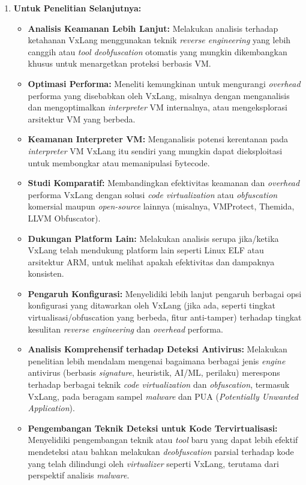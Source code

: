 \begin{enumerate}
    \item \textbf{Untuk Penelitian Selanjutnya:}
        \begin{itemize}
            \item \textbf{Analisis Keamanan Lebih Lanjut:} Melakukan analisis terhadap ketahanan VxLang menggunakan teknik \textit{reverse engineering} yang lebih canggih atau \textit{tool deobfuscation} otomatis yang mungkin dikembangkan khusus untuk menargetkan proteksi berbasis VM.
            \item \textbf{Optimasi Performa:} Meneliti kemungkinan untuk mengurangi \textit{overhead} performa yang disebabkan oleh VxLang, misalnya dengan menganalisis dan mengoptimalkan \textit{interpreter} VM internalnya, atau mengeksplorasi arsitektur VM yang berbeda.
            \item \textbf{Keamanan Interpreter VM:} Menganalisis potensi kerentanan pada \textit{interpreter} VM VxLang itu sendiri yang mungkin dapat dieksploitasi untuk membongkar atau memanipulasi \f{bytecode}.
            \item \textbf{Studi Komparatif:} Membandingkan efektivitas keamanan dan \textit{overhead} performa VxLang dengan solusi \textit{code virtualization} atau \textit{obfuscation} komersial maupun \textit{open-source} lainnya (misalnya, VMProtect, Themida, LLVM Obfuscator).
            \item \textbf{Dukungan Platform Lain:} Melakukan analisis serupa jika/ketika VxLang telah mendukung platform lain seperti Linux ELF atau arsitektur ARM, untuk melihat apakah efektivitas dan dampaknya konsisten.
            \item \textbf{Pengaruh Konfigurasi:} Menyelidiki lebih lanjut pengaruh berbagai opsi konfigurasi yang ditawarkan oleh VxLang (jika ada, seperti tingkat virtualisasi/obfuscation yang berbeda, fitur anti-tamper) terhadap tingkat kesulitan \textit{reverse engineering} dan \textit{overhead} performa.
            \item \textbf{Analisis Komprehensif terhadap Deteksi Antivirus:} Melakukan penelitian lebih mendalam mengenai bagaimana berbagai jenis \textit{engine} antivirus (berbasis \textit{signature}, heuristik, AI/ML, perilaku) merespons terhadap berbagai teknik \textit{code virtualization} dan \textit{obfuscation}, termasuk VxLang, pada beragam sampel \textit{malware} dan PUA (\textit{Potentially Unwanted Application}).
            \item \textbf{Pengembangan Teknik Deteksi untuk Kode Tervirtualisasi:} Menyelidiki pengembangan teknik atau \textit{tool} baru yang dapat lebih efektif mendeteksi atau bahkan melakukan \textit{deobfuscation} parsial terhadap kode yang telah dilindungi oleh \textit{virtualizer} seperti VxLang, terutama dari perspektif analisis \textit{malware}.
        \end{itemize}
\end{enumerate}
